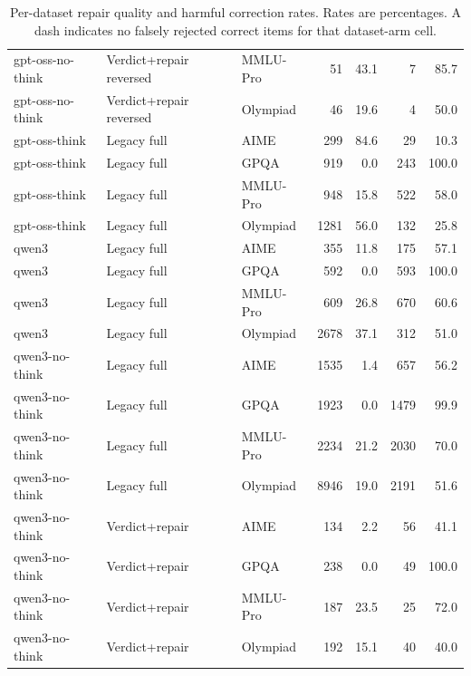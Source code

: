 \documentclass[journal]{IEEEtran}
\begin{document}
\begin{table}[p]
{\begin{tabular}{lllrrrr}
gpt-oss-no-think & Verdict+repair reversed & MMLU-Pro & 51 & 43.1 & 7 & 85.7 \\
gpt-oss-no-think & Verdict+repair reversed & Olympiad & 46 & 19.6 & 4 & 50.0 \\
gpt-oss-think & Legacy full & AIME & 299 & 84.6 & 29 & 10.3 \\
gpt-oss-think & Legacy full & GPQA & 919 & 0.0 & 243 & 100.0 \\
gpt-oss-think & Legacy full & MMLU-Pro & 948 & 15.8 & 522 & 58.0 \\
gpt-oss-think & Legacy full & Olympiad & 1281 & 56.0 & 132 & 25.8 \\
qwen3 & Legacy full & AIME & 355 & 11.8 & 175 & 57.1 \\
qwen3 & Legacy full & GPQA & 592 & 0.0 & 593 & 100.0 \\
qwen3 & Legacy full & MMLU-Pro & 609 & 26.8 & 670 & 60.6 \\
qwen3 & Legacy full & Olympiad & 2678 & 37.1 & 312 & 51.0 \\
qwen3-no-think & Legacy full & AIME & 1535 & 1.4 & 657 & 56.2 \\
qwen3-no-think & Legacy full & GPQA & 1923 & 0.0 & 1479 & 99.9 \\
qwen3-no-think & Legacy full & MMLU-Pro & 2234 & 21.2 & 2030 & 70.0 \\
qwen3-no-think & Legacy full & Olympiad & 8946 & 19.0 & 2191 & 51.6 \\
qwen3-no-think & Verdict+repair & AIME & 134 & 2.2 & 56 & 41.1 \\
qwen3-no-think & Verdict+repair & GPQA & 238 & 0.0 & 49 & 100.0 \\
qwen3-no-think & Verdict+repair & MMLU-Pro & 187 & 23.5 & 25 & 72.0 \\
qwen3-no-think & Verdict+repair & Olympiad & 192 & 15.1 & 40 & 40.0 \\
\bottomrule
\end{tabular}
}
\caption{Per-dataset repair quality and harmful correction rates. Rates are percentages. A dash indicates no falsely rejected correct items for that dataset-arm cell.}
\label{tab:per-dataset-repair-quality}
\end{table}
\end{document}

